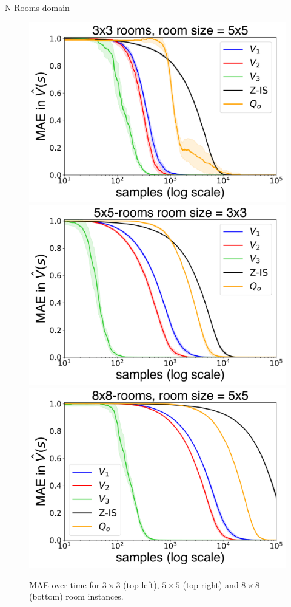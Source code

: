 \documentclass{beamer}
\theoremstyle{mystyle}
\begin{document}
\begin{frame}{N-Rooms domain}

    \begin{figure}[H]
    \centering
    \includegraphics[scale=0.2]{Figures/nroom_3_3-1.png}
    \includegraphics[scale=0.2]{Figures/nroom_5_5-1.png}
    \includegraphics[scale=0.2]{Figures/nroom_8_8-1.png}
    
    \caption{MAE over time for $3 \times 3$ (top-left), $5 \times 5$ (top-right) and $8 \times 8$ (bottom) room instances.}
    \label{fig:errors_grid}
    \end{figure}
    
    \end{frame}
\end{document}

